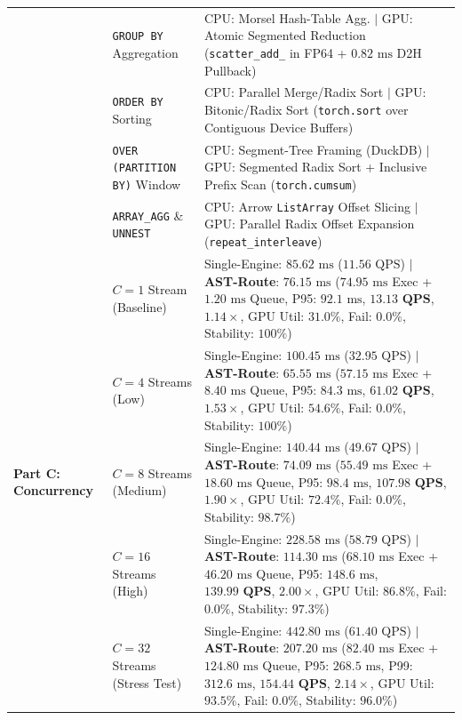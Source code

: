 \documentclass[10pt,a4paper]{article}
\begin{document}
\begin{table}[!t]
\begin{tabular}{@{}p{}p{}p{}@{}}
 & \texttt{GROUP BY} Aggregation & CPU: Morsel Hash-Table Agg. $|$ GPU: Atomic Segmented Reduction (\texttt{scatter\_add\_} in FP64 + $0.82\text{ ms}$ D2H Pullback) \\
 & \texttt{ORDER BY} Sorting & CPU: Parallel Merge/Radix Sort $|$ GPU: Bitonic/Radix Sort (\texttt{torch.sort} over Contiguous Device Buffers) \\
 & \texttt{OVER (PARTITION BY)} Window & CPU: Segment-Tree Framing (DuckDB) $|$ GPU: Segmented Radix Sort + Inclusive Prefix Scan (\texttt{torch.cumsum}) \\
 & \texttt{ARRAY\_AGG} \& \texttt{UNNEST} & CPU: Arrow \texttt{ListArray} Offset Slicing $|$ GPU: Parallel Radix Offset Expansion (\texttt{repeat\_interleave}) \\
\midrule
\multirow{5}{=}{\textbf{Part C: Concurrency}}
 & $C=1$ Stream (Baseline) & Single-Engine: $85.62\text{ ms}$ ($11.56\text{ QPS}$) $|$ \textbf{AST-Route}: $76.15\text{ ms}$ ($74.95\text{ ms}$ Exec + $1.20\text{ ms}$ Queue, P95: $92.1\text{ ms}$, $\mathbf{13.13\text{ QPS}}$, $1.14\times$, GPU Util: $31.0\%$, Fail: $0.0\%$, Stability: $100\%$) \\
 & $C=4$ Streams (Low) & Single-Engine: $100.45\text{ ms}$ ($32.95\text{ QPS}$) $|$ \textbf{AST-Route}: $65.55\text{ ms}$ ($57.15\text{ ms}$ Exec + $8.40\text{ ms}$ Queue, P95: $84.3\text{ ms}$, $\mathbf{61.02\text{ QPS}}$, $1.53\times$, GPU Util: $54.6\%$, Fail: $0.0\%$, Stability: $100\%$) \\
 & $C=8$ Streams (Medium) & Single-Engine: $140.44\text{ ms}$ ($49.67\text{ QPS}$) $|$ \textbf{AST-Route}: $74.09\text{ ms}$ ($55.49\text{ ms}$ Exec + $18.60\text{ ms}$ Queue, P95: $98.4\text{ ms}$, $\mathbf{107.98\text{ QPS}}$, $1.90\times$, GPU Util: $72.4\%$, Fail: $0.0\%$, Stability: $98.7\%$) \\
 & $C=16$ Streams (High) & Single-Engine: $228.58\text{ ms}$ ($58.79\text{ QPS}$) $|$ \textbf{AST-Route}: $114.30\text{ ms}$ ($68.10\text{ ms}$ Exec + $46.20\text{ ms}$ Queue, P95: $148.6\text{ ms}$, $\mathbf{139.99\text{ QPS}}$, $2.00\times$, GPU Util: $86.8\%$, Fail: $0.0\%$, Stability: $97.3\%$) \\
 & $C=32$ Streams (Stress Test) & Single-Engine: $442.80\text{ ms}$ ($61.40\text{ QPS}$) $|$ \textbf{AST-Route}: $207.20\text{ ms}$ ($82.40\text{ ms}$ Exec + $124.80\text{ ms}$ Queue, P95: $268.5\text{ ms}$, P99: $312.6\text{ ms}$, $\mathbf{154.44\text{ QPS}}$, $\mathbf{2.14\times}$, GPU Util: $93.5\%$, Fail: $0.0\%$, Stability: $96.0\%$) \\
\bottomrule
\end{tabular}
\end{table}
\end{document}
